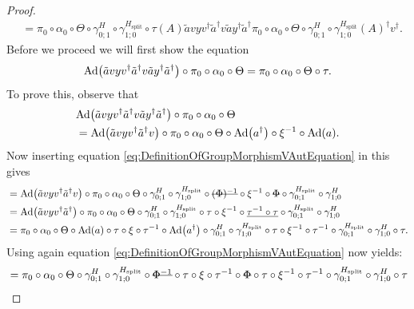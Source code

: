\documentclass[12pt,a4paper,twoside]{article}
\numberwithin{equation}{section}
\begin{document}
\begin{proof}
\begin{align}
	\label{eq:lem:phi1phi2matchingCondition:Proof_v_Part1}
	&=\pi_0\circ\alpha_0\circ\Theta\circ\gamma^{H}_{0;1}\circ\gamma^{H_{\text{split}}}_{1;0}\circ\tau(A)\tilde{a}vyv^\dagger\tilde{a}^\dagger v \tilde{a}y^\dagger\tilde{a}^\dagger \pi_0\circ\alpha_0\circ\Theta\circ\gamma^{H}_{0;1}\circ\gamma^{H_{\text{split}}}_{1;0}(A)^\dagger v^\dagger.
	\end{align}
	Before we proceed we will first show the equation
	\begin{equation}\label{eq:lem:phi1phi2matchingCondition:Proof_v_Part2}
		\Ad{\tilde{a}vyv^\dagger\tilde{a}^\dagger v\tilde{a}y^\dagger\tilde{a}^\dagger}\circ\pi_0\circ\alpha_0\circ\Theta=\pi_0\circ\alpha_0\circ\Theta\circ\tau.
	\end{equation}
	To prove this, observe that
	\begin{align}
	&\Ad{\tilde{a}vyv^\dagger\tilde{a}^\dagger v\tilde{a}y^\dagger\tilde{a}^\dagger}\circ\pi_0\circ\alpha_0\circ\Theta\\
	&=\Ad{\tilde{a}vyv^\dagger\tilde{a}^\dagger v}\circ\pi_0\circ\alpha_0\circ\Theta\circ\Ad{a^\dagger}\circ\xi^{-1}\circ\Ad{a}.
	\end{align}
	Now inserting equation \eqref{eq:DefinitionOfGroupMorphismVAutEquation} in this gives
	\begin{align}
	&=\Ad{\tilde{a}vyv^\dagger\tilde{a}^\dagger v}\circ\pi_0\circ\alpha_0\circ\Theta\circ\gamma^{H}_{0;1}\circ\gamma^{H_{\text{split}}}_{1;0}\circ\stkout{(\Phi)^{-1}}\circ\xi^{-1}\circ\stkout{\Phi}\circ\gamma^{H_{\text{split}}}_{0;1}\circ\gamma^H_{1;0}\\
	&=\Ad{\tilde{a}vyv^\dagger\tilde{a}^\dagger }\circ\pi_0\circ\alpha_0\circ\Theta\circ\gamma^{H}_{0;1}\circ\gamma^{H_{\text{split}}}_{1;0}\circ\tau\circ\xi^{-1}\circ\underline{\tau^{-1}\circ\tau}\circ\gamma^{H_{\text{split}}}_{0;1}\circ\gamma^H_{1;0}\\
	&=\pi_0\circ\alpha_0\circ\Theta\circ\Ad{a}\circ\tau\circ\xi\circ\tau^{-1}\circ\Ad{a^\dagger}\circ\gamma^{H}_{0;1}\circ\gamma^{H_{\text{split}}}_{1;0}\circ\tau\circ\xi^{-1}\circ\tau^{-1}\circ\gamma^{H_{\text{split}}}_{0;1}\circ\gamma^H_{1;0}\circ\tau.
	\end{align}
	Using again equation \eqref{eq:DefinitionOfGroupMorphismVAutEquation} now yields:
	\begin{align}
	&=\pi_0\circ\alpha_0\circ\Theta\circ\gamma^{H}_{0;1}\circ\gamma^{H_{\text{split}}}_{1;0}\circ\stkout{\Phi^{-1}}\circ\tau\circ\xi\circ\tau^{-1}\circ\stkout{\Phi}\circ\tau\circ\xi^{-1}\circ\tau^{-1}\circ\gamma^{H_{\text{split}}}_{0;1}\circ\gamma^H_{1;0}\circ\tau\\

\end{align}
\end{proof}
\end{document}
